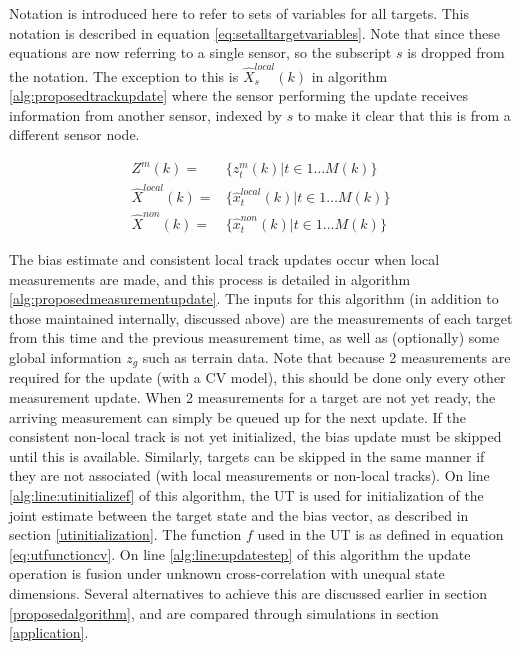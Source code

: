 \documentclass[journal]{IEEEtran}
\begin{document}
Notation is introduced here to refer to sets of variables for all targets. This notation is described in equation \ref{eq:setalltargetvariables}. Note that since these equations are now referring to a single sensor, so the subscript $s$ is dropped from the notation. The exception to this is $\hat{X}_{s}^{local}(k)$ in algorithm \ref{alg:proposedtrackupdate} where the sensor performing the update receives information from another sensor, indexed by $s$ to make it clear that this is from a different sensor node.

\begin{equation}
\begin{aligned}
    Z^m(k) ={}& \{ z_{t}^{m}(k) | t \in 1 \ldots M(k) \} \\
    \hat{X}^{local}(k) = {}& \{ \hat{x}_{t}^{local}(k) | t \in 1 \ldots M(k) \} \\
    \hat{X}^{non}(k) = {}& \{ \hat{x}_{t}^{non}(k) | t \in 1 \ldots M(k) \}
\end{aligned} \label{eq:setalltargetvariables}
\end{equation}

The bias estimate and consistent local track updates occur when local measurements are made, and this process is detailed in algorithm \ref{alg:proposedmeasurementupdate}. The inputs for this algorithm (in addition to those maintained internally, discussed above) are the measurements of each target from this time and the previous measurement time, as well as (optionally) some global information $z_g$ such as terrain data. Note that because 2 measurements are required for the update (with a CV model), this should be done only every other measurement update. When 2 measurements for a target are not yet ready, the arriving measurement can simply be queued up for the next update. If the consistent non-local track is not yet initialized, the bias update must be skipped until this is available. Similarly, targets can be skipped in the same manner if they are not associated (with local measurements or non-local tracks). On line \ref{alg:line:utinitializef} of this algorithm, the UT is used for initialization of the joint estimate between the target state and the bias vector, as described in section \ref{utinitialization}. The function $f$ used in the UT is as defined in equation \ref{eq:utfunctioncv}. On line \ref{alg:line:updatestep} of this algorithm the update operation is fusion under unknown cross-correlation with unequal state dimensions. Several alternatives to achieve this are discussed earlier in section \ref{proposedalgorithm}, and are compared through simulations in section \ref{application}.
\end{document}
